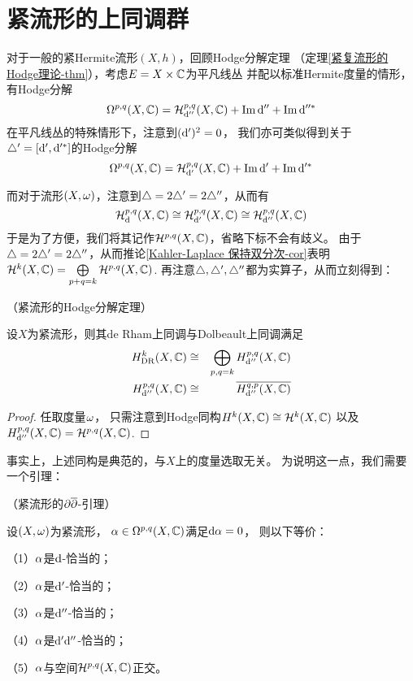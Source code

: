 \section{紧\Kahler 流形的上同调群}

对于一般的紧Hermite流形$(X,h)$，回顾Hodge分解定理
（定理\ref{紧复流形的Hodge理论-thm}），考虑$E=X\times\mathbb{C}$为平凡线丛
并配以标准Hermite度量的情形，有Hodge分解
$$
  \Omega^{p,q}(X,\mathbb{C})=
  \mathcal{H}^{p,q}_{\mathrm{d}''}(X,\mathbb{C})+\operatorname{Im}\mathrm{d}''+\operatorname{Im}\mathrm{d}''^*
$$
在平凡线丛的特殊情形下，注意到$(\mathrm{d}')^2=0$，
我们亦可类似得到关于$\triangle'=[\mathrm{d}',\mathrm{d}'^*]$的Hodge分解
$$
  \Omega^{p,q}(X,\mathbb{C})=
  \mathcal{H}^{p,q}_{\mathrm{d}'}(X,\mathbb{C})+\operatorname{Im}\mathrm{d}'+\operatorname{Im}\mathrm{d}'^*
$$

而对于\Kahler 流形$(X,\omega)$，注意到$\triangle=2\triangle'=2\triangle''$，从而有
$$
     \mathcal{H}^{p,q}_{\mathrm{d}}(X,\mathbb{C})
\cong\mathcal{H}^{p,q}_{\mathrm{d}'}(X,\mathbb{C})
\cong\mathcal{H}^{p,q}_{\mathrm{d}''}(X,\mathbb{C})
$$
于是为了方便，我们将其记作$\mathcal{H}^{p,q}(X,\mathbb{C})$，省略下标不会有歧义。
由于$\triangle=2\triangle'=2\triangle''$，从而推论\ref{Kahler-Laplace 保持双分次-cor}表明
$\mathcal{H}^{k}(X,\mathbb{C})=\bigoplus\limits_{p+q=k}\mathcal{H}^{p,q}(X,\mathbb{C})$.
再注意$\triangle,\triangle',\triangle''$都为实算子，从而立刻得到：

\begin{thm}（紧\Kahler 流形的Hodge分解定理）
\label{紧Kahler流形的Hodge分解-thm}

设$X$为紧\Kahler 流形，则其de Rham上同调与Dolbeault上同调满足
\begin{eqnarray*}
  H^k_{\operatorname{DR}}(X,\mathbb{C})&\cong&
  \bigoplus_{p,q=k}H^{p,q}_{\mathrm{d}''}(X,\mathbb{C})
\\
  H^{p,q}_{\mathrm{d}''}(X,\mathbb{C})&\cong&
  \overline{
  H^{q,p}_{\mathrm{d}''}(X,\mathbb{C})
  }
\end{eqnarray*}
\end{thm}

\begin{proof}
任取\Kahler 度量$\omega$，
只需注意到Hodge同构$H^k(X,\mathbb{C})\cong\mathcal{H}^k(X,\mathbb{C})$
以及$H^{p,q}_{\mathrm{d}''}(X,\mathbb{C})=\mathcal{H}^{p,q}(X,\mathbb{C})$.
\end{proof}

事实上，上述同构是典范的，与$X$上的\Kahler 度量选取无关。
为说明这一点，我们需要一个引理：

\begin{lemma}（紧\Kahler 流形的$\partial\overline{\partial}$-引理）
\label{紧Kahler流形的ppbar引理}

设$(X,\omega)$为紧\Kahler 流形，
$\alpha\in\Omega^{p,q}(X,\mathbb{C})$满足$\mathrm{d}\alpha=0$，
则以下等价：

（1）$\alpha$是$\mathrm{d}$-恰当的；

（2）$\alpha$是$\mathrm{d}'$-恰当的；

（3）$\alpha$是$\mathrm{d}''$-恰当的；

（4）$\alpha$是$\mathrm{d}'\mathrm{d}''$-恰当的；

（5）$\alpha$与空间$\mathcal{H}^{p,q}(X,\mathbb{C})$正交。
\end{lemma}

